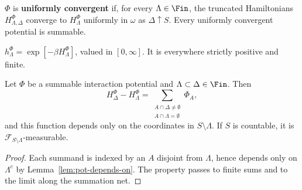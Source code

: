 \begin{definition}
    \label{def:pot-uniformly-convergent}
    \leanok{}

    $\Phi$ is \textbf{uniformly convergent} if, for every $\Lambda\in\Fin$, the truncated
    Hamiltonians $H_{\Lambda,\Delta}^\Phi$ converge to $H_\Lambda^\Phi$ uniformly in $\omega$ as
    $\Delta\uparrow S$. Every uniformly convergent potential is summable.
\end{definition}

\begin{definition}
    \label{def:pot-boltzmann-factor}
    \leanok{}

    $h_\Lambda^\Phi=\exp[-\beta H_\Lambda^\Phi]$, valued in $[0,\infty]$. It is everywhere
    strictly positive and finite.
\end{definition}

\begin{lemma}[Georgii (2.6)]
    \label{lem:pot-hamiltonian-diff}
    \leanok{}

    Let $\Phi$ be a summable interaction potential and $\Lambda\subset\Delta\in\Fin$. Then
    \[
      H_\Delta^\Phi-H_\Lambda^\Phi
        =\sum_{\substack{A\cap\Delta\neq\emptyset\\ A\cap\Lambda=\emptyset}}\Phi_A,
    \]
    and this function depends only on the coordinates in $S\setminus\Lambda$. If $S$ is
    countable, it is $\mathcal{F}_{S\setminus\Lambda}$-measurable.
\end{lemma}
\begin{proof}
    \leanok{}

    Each summand is indexed by an $A$ disjoint from $\Lambda$, hence depends only on
    $\Lambda^c$ by Lemma~\ref{lem:pot-depends-on}. The property passes to finite sums and to the
    limit along the summation net.
\end{proof}

